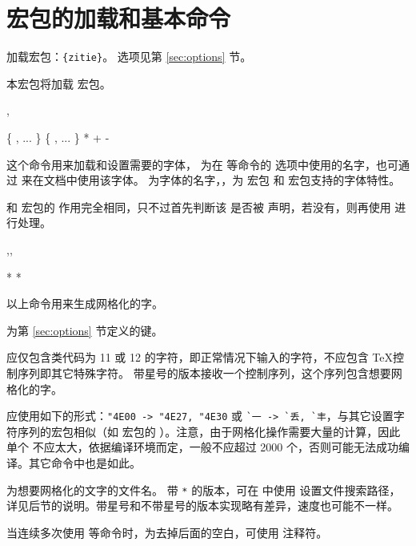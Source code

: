 \documentclass{ctxdoc}
\begin{document}
\section{ 宏包的加载和基本命令}\label{sec:basics}

加载宏包：\verb|{zitie}|。 选项见第 \ref{sec:options} 节。

本宏包将加载  宏包\cite{pkg-xeCJK}。

\begin{function}{\zitienewfont,\zitieCJKfamily}
  \begin{syntax}
     \{   , ... \}
     \{    , ... \}
     *   
     
    + 
    - 
  \end{syntax}
  这个命令用来加载和设置需要的字体， 为在  等命令的  选项中使用的名字，也可通过  来在文档中使用该字体。 为字体的名字，，为  宏包\cite{pkg-fontspec} 和  宏包支持的字体特性。

   和  宏包的  作用完全相同，只不过首先判断该  是否被  声明，若没有，则再使用  进行处理。
\end{function}

\begin{function}{\framezi,\framerange,\framezifile}
  \begin{syntax}
     *  
      
     *  
  \end{syntax}
  以上命令用来生成网格化的字。
  
   为第 \ref{sec:options} 节定义的键。

   应仅包含类代码为 11 或 12 的字符，即正常情况下输入的字符，不应包含 \TeX 控制序列即其它特殊字符。 带星号的版本接收一个控制序列，这个序列包含想要网格化的字。

   应使用如下的形式：\verb|"4E00 -> "4E27, "4E30| 或 \verb|`一 -> `丢, `丰|，与其它设置字符序列的宏包相似（如  宏包的 ）。注意，由于网格化操作需要大量的计算，因此单个  不应太大，依据编译环境而定，一般不应超过 2000 个，否则可能无法成功编译。其它命令中也是如此。

   为想要网格化的文字的文件名。 带 \verb|*| 的版本，可在  中使用  设置文件搜索路径，详见后节的说明。带星号和不带星号的版本实现略有差异，速度也可能不一样。

  当连续多次使用  等命令时，为去掉后面的空白，可使用 \opt{\%} 注释符。
\end{function}
\end{document}
